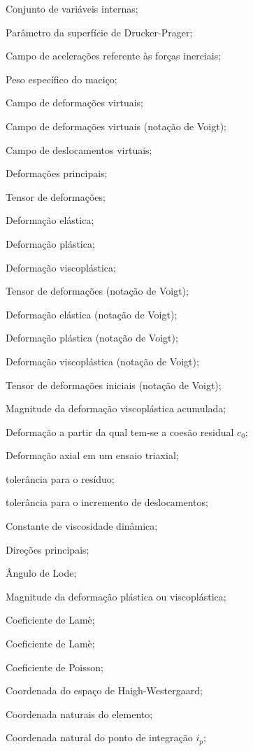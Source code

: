 \item[\textbf{Grego minúsculo:}]
\item[$\alphal$] Conjunto de variáveis internas;
\item[$\beta$] Parâmetro da superfície de Drucker-Prager;
\item[$ \gammal $] 		Campo de acelerações referente às forças inerciais;
\item[$\gamma_m$] 		Peso específico do maciço;
\item[$\dvarepsilonll$]		Campo de deformações virtuais;
\item[$\dvarepsilonl$]		Campo de deformações virtuais (notação de Voigt);
\item[$\dul$]		Campo de deslocamentos virtuais;
\item[$\varepsilon_1,\varepsilon_2,\varepsilon_3$] 	Deformações principais;
\item[$ \varepsilonll $] 	Tensor de deformações;
\item[$\varepsilonll^e$] Deformação elástica;
\item[$\varepsilonll^p$] Deformação plástica;
\item[$\varepsilonll^{vp}$] Deformação viscoplástica;
\item[$ \varepsilonl $] 	Tensor de deformações (notação de Voigt);
\item[$\varepsilonl^e$] Deformação elástica (notação de Voigt);
\item[$\varepsilonl^p$] Deformação plástica (notação de Voigt);
\item[$\varepsilonl^{vp}$] Deformação viscoplástica (notação de Voigt);

\item[$ \varepsilonl_0 $] Tensor de deformações iniciais (notação de Voigt);
\item[$\bar{\varepsilon}^{vp}$] Magnitude da deformação viscoplástica acumulada;
\item[$ \varepsilon_0 $] Deformação a partir da qual tem-se a coesão residual $c_0$;
\item[$ \varepsilon_a $] Deformação axial em um ensaio triaxial;
\item[$ \varepsilon_R $] tolerância para o resíduo;
\item[$ \varepsilon_u $] tolerância para o incremento de deslocamentos;

\item[$ \eta $] 		Constante de viscosidade dinâmica;
\item[$\eta_1,\eta_2,\eta_3$] 	Direções principais;
\item[$ \theta $] 		Ângulo de Lode;
\item[$\lambda$] 	Magnitude da deformação plástica ou viscoplástica;
\item[$\lambda^e$] 	Coeficiente de Lamè;
\item[$\mu^e$] 	Coeficiente de Lamè;
\item[$ \nu $] 			Coeficiente de Poisson;
\item[$ \xi_{H} $] 				Coordenada do espaço de Haigh-Westergaard;
\item[$\underline \xi$] 				Coordenada naturais do elemento;
\item[$\xil_{i_p}$] 				Coordenada natural do ponto de integração $i_p$;


